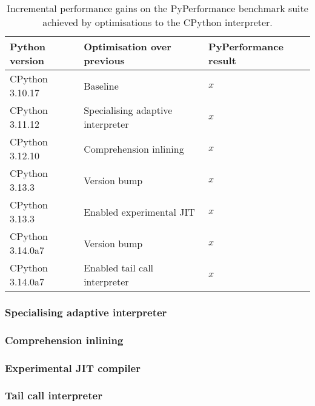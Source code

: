 
\begin{table}[H]
  \caption{Incremental performance gains on the PyPerformance benchmark suite achieved by optimisations to the CPython interpreter.}
  \label{tab:faster-cpython}
  \centering
  \begin{tabular}{lll}
    \toprule
    \textbf{Python version} & \textbf{Optimisation over previous} & \textbf{PyPerformance result} \\
    \midrule
    CPython 3.10.17 & Baseline & $x$ \\
    CPython 3.11.12 & Specialising adaptive interpreter & $x$ \\
    CPython 3.12.10 & Comprehension inlining & $x$ \\
    CPython 3.13.3 & Version bump & $x$ \\
    CPython 3.13.3 & Enabled experimental JIT & $x$ \\
    CPython 3.14.0a7 & Version bump & $x$ \\
    CPython 3.14.0a7 & Enabled tail call interpreter & $x$ \\
    \bottomrule
  \end{tabular}
\end{table}

\subsubsection{Specialising adaptive interpreter}
\label{sssec:graalvm}

\subsubsection{Comprehension inlining}
\label{sssec:graalvm}

\subsubsection{Experimental JIT compiler}
\label{sssec:graalvm}

\subsubsection{Tail call interpreter}
\label{sssec:graalvm}

